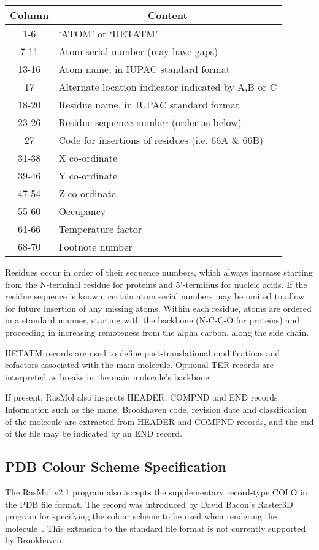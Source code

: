 \begin{center}\begin{tabular}{|c|l|} \hline
{\bf Column} & \multicolumn{1}{c|}{\bf Content} \\ \hline
1-6   & `ATOM' or `HETATM' \\
7-11  & Atom serial number (may have gaps) \\
13-16 & Atom name, in IUPAC standard format \\
17    & Alternate location indicator indicated by A,B or C \\
18-20 & Residue name, in IUPAC standard format \\
23-26 & Residue sequence number (order as below) \\
27    & Code for insertions of residues (i.e. 66A \& 66B) \\
31-38 & X co-ordinate \\
39-46 & Y co-ordinate \\
47-54 & Z co-ordinate \\
55-60 & Occupancy \\
61-66 & Temperature factor \\
68-70 & Footnote number \\ \hline
\end{tabular}\end{center}

Residues occur in order of their sequence numbers, which always increase
starting from the N-terminal residue for proteins and $5'$-terminus for
nucleic acids. If the residue sequence is known, certain atom serial
numbers may be omited to allow for future insertion of any missing atoms.
Within each residue, atoms are ordered in a standard manner, starting with
the backbone (N-C-C-O for proteins) and proceeding in increasing remoteness
from the alpha carbon, along the side chain. 

HETATM records are used to define post-translational modifications and
cofactors associated with the main molecule. Optional TER records are
interpreted as breaks in the main molecule's backbone.

If present, RasMol also inspects HEADER, COMPND and END records. Information
such as the name, Brookhaven code, revision date and classification of the 
molecule are extracted from HEADER and COMPND records, and the end of the 
file may be indicated by an END record.


\subsection{PDB Colour Scheme Specification}
\label{Scheme}
The RasMol v2.1 program also accepts the supplementary record-type COLO
in the PDB file format. The record was introduced by David Bacon's 
Raster3D program for specifying the colour scheme to be used when 
rendering the molecule~\cite{Bacon88b,Bacon88a}. This extension to 
the standard file format is not currently supported by Brookhaven.

